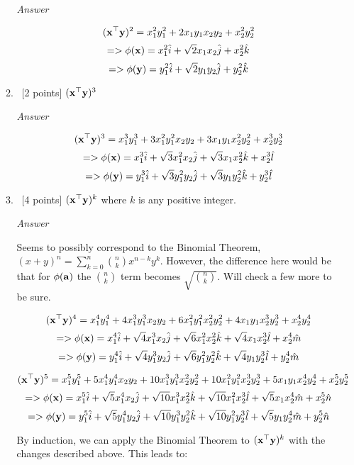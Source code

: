 \documentclass[12pt, fullpage,letterpaper]{article}
\begin{document}
\begin{enumerate}
\begin{enumerate}
		\emph{Answer}
		
		\[
		    ({\bf x}^\top {\bf y})^2 = x_1^2y_1^2 + 2x_1y_1x_2y_2 + x_2^2y_2^2
		\]
		\[
            => \phi({\bf x}) = x_1^2\hat{i} + \sqrt{2}x_1x_2\hat{j} + x_2^2\hat{k}
        \]
		\[
            => \phi({\bf y}) = y_1^2\hat{i} + \sqrt{2}y_1y_2\hat{j} + y_2^2\hat{k}
        \]
        
        
		
		\item~[2 points] $({\bf x}^\top {\bf y})^3$
		
		\emph{Answer}
		
		\[
		    ({\bf x}^\top {\bf y})^3 = x_1^3y_1^3 + 3x_1^2y_1^2x_2y_2 + 3x_1y_1x_2^2y_2^2 + x_2^3y_2^3
		\]
		\[
            => \phi({\bf x}) = x_1^3\hat{i} + \sqrt{3}x_1^2x_2\hat{j} + \sqrt{3}x_1x_2^2\hat{k} + x_2^3\hat{l}
        \]
		\[
            => \phi({\bf y}) = y_1^3\hat{i} + \sqrt{3}y_1^2y_2\hat{j} + \sqrt{3}y_1y_2^2\hat{k} + y_2^3\hat{l}
        \]
        
		\item~[4 points] $({\bf x}^\top {\bf y})^k$ where $k$ is  any positive integer.  
		
		\emph{Answer}
		
		Seems to possibly correspond to the Binomial Theorem, $(x+y)^n = \sum_{k=0}^n {n \choose k}x^{n-k}y^k$. However, the difference here would be that for $\phi({\bf a})$ the $n \choose k$ term becomes $\sqrt{n \choose k}$. Will check a few more to be sure.
		
		\[
		    ({\bf x}^\top {\bf y})^4 = x_1^4y_1^4 + 4x_1^3y_1^3x_2y_2 + 6x_1^2y_1^2x_2^2y_2^2 + 4x_1y_1x_2^3y_2^3 + x_2^4y_2^4
		\]
		\[
            => \phi({\bf x}) = x_1^4\hat{i} + \sqrt{4}x_1^3x_2\hat{j} + \sqrt{6}x_1^2x_2^2\hat{k} + \sqrt{4}x_1x_2^3\hat{l} + x_2^4\hat{m}
        \]
		\[
            => \phi({\bf y}) = y_1^4\hat{i} + \sqrt{4}y_1^3y_2\hat{j} + \sqrt{6}y_1^2y_2^2\hat{k} + \sqrt{4}y_1y_2^3\hat{l} + y_2^4\hat{m}
        \]
        
        \[
		    ({\bf x}^\top {\bf y})^5 = x_1^5y_1^5 + 5x_1^4y_1^4x_2y_2 + 10x_1^3y_1^3x_2^2y_2^2 + 10x_1^2y_1^2x_2^3y_2^3 + 5x_1y_1x_2^4y_2^4 + x_2^5y_2^5
		\]
		\[
            => \phi({\bf x}) = x_1^5\hat{i} + \sqrt{5}x_1^4x_2\hat{j} + \sqrt{10}x_1^3x_2^2\hat{k} + \sqrt{10}x_1^2x_2^3\hat{l} + \sqrt{5}x_1x_2^4\hat{m} + x_2^5\hat{n}
        \]
		\[
            => \phi({\bf y}) = y_1^5\hat{i} + \sqrt{5}y_1^4y_2\hat{j} + \sqrt{10}y_1^3y_2^2\hat{k} + \sqrt{10}y_1^2y_2^3\hat{l} + \sqrt{5}y_1y_2^4\hat{m} + y_2^5\hat{n}
        \]
        
        By induction, we can apply the Binomial Theorem to $({\bf x}^\top {\bf y})^k$ with the changes described above. This leads to:
        

\end{enumerate}
\end{enumerate}
\end{document}
